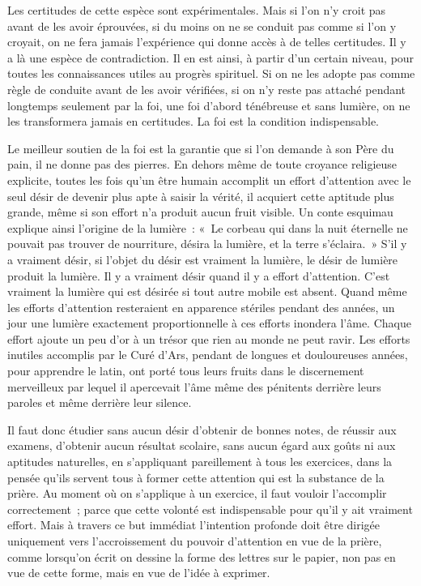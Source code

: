\documentclass[french,twoside]{book} %
\begin{document}
Les certitudes de cette espèce sont expérimentales. Mais si l'on n'y croit pas avant de les avoir éprouvées, si du moins on ne se conduit pas comme si l'on y croyait, on ne fera jamais l'expérience qui donne accès à de telles certitudes. Il y a là une espèce de contradiction. Il en est ainsi, à partir d'un certain niveau, pour toutes les connaissances utiles au progrès spirituel. Si on ne les adopte pas comme règle de conduite avant de les avoir vérifiées, si on n'y reste pas attaché pendant longtemps seulement par la foi, une foi d'abord ténébreuse et sans lumière, on ne les transformera jamais en certitudes. La foi est la condition indispensable.\par
Le meilleur soutien de la foi est la garantie que si l'on demande à son Père du pain, il ne donne pas des pierres. En dehors même de toute croyance religieuse explicite, toutes les fois qu'un être humain accomplit un effort d'attention avec le seul désir de devenir plus apte à saisir la vérité, il acquiert cette aptitude plus grande, même si son effort n'a produit aucun fruit visible. Un conte esquimau explique ainsi l'origine de la lumière : « Le corbeau qui dans la nuit éternelle ne pouvait pas trouver de nourriture, désira la lumière, et la terre s'éclaira. » S'il y a vraiment désir, si l'objet du désir est vraiment la lumière, le désir de lumière produit la lumière. Il y a vraiment désir quand il y a effort d'attention. C'est vraiment la lumière qui est désirée si tout autre mobile est absent. Quand même les efforts d'attention resteraient en apparence stériles pendant des années, un jour une lumière exactement proportionnelle à ces efforts inondera l'âme. Chaque effort ajoute un peu d'or à un trésor que rien au monde ne peut ravir. Les efforts inutiles accomplis par le Curé d'Ars, pendant de longues et douloureuses années, pour apprendre le latin, ont porté tous leurs fruits dans le discernement merveilleux par lequel il apercevait l'âme même des pénitents derrière leurs paroles et même derrière leur silence.\par
Il faut donc étudier sans aucun désir d'obtenir de bonnes notes, de réussir aux examens, d'obtenir aucun résultat scolaire, sans aucun égard aux goûts ni aux aptitudes naturelles, en s'appliquant pareillement à tous les exercices, dans la pensée qu'ils servent tous à former cette attention qui est la substance de la prière. Au moment où on s'applique à un exercice, il faut vouloir l'accomplir correctement ; parce que cette volonté est indispensable pour qu'il y ait vraiment effort. Mais à travers ce but immédiat l'intention profonde doit être dirigée uniquement vers l'accroissement du pouvoir d'attention en vue de la prière, comme lorsqu'on écrit on dessine la forme des lettres sur le papier, non pas en vue de cette forme, mais en vue de l'idée à exprimer.\par
\end{document}
